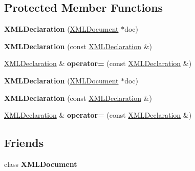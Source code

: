 \subsection*{Protected Member Functions}
\begin{DoxyCompactItemize}
\item 
\mbox{\label{classtinyxml2_1_1XMLDeclaration_aef9586f2ce5df5feba74dde49a242b06}} 
{\bfseries X\+M\+L\+Declaration} (\hyperlink{classtinyxml2_1_1XMLDocument}{X\+M\+L\+Document} $\ast$doc)
\item 
\mbox{\label{classtinyxml2_1_1XMLDeclaration_a5229cc0b31f034f93289af27ec3e2836}} 
{\bfseries X\+M\+L\+Declaration} (const \hyperlink{classtinyxml2_1_1XMLDeclaration}{X\+M\+L\+Declaration} \&)
\item 
\mbox{\label{classtinyxml2_1_1XMLDeclaration_a79eb518c2c2b1b99a122a5d5a308b7ee}} 
\hyperlink{classtinyxml2_1_1XMLDeclaration}{X\+M\+L\+Declaration} \& {\bfseries operator=} (const \hyperlink{classtinyxml2_1_1XMLDeclaration}{X\+M\+L\+Declaration} \&)
\item 
\mbox{\label{classtinyxml2_1_1XMLDeclaration_aef9586f2ce5df5feba74dde49a242b06}} 
{\bfseries X\+M\+L\+Declaration} (\hyperlink{classtinyxml2_1_1XMLDocument}{X\+M\+L\+Document} $\ast$doc)
\item 
\mbox{\label{classtinyxml2_1_1XMLDeclaration_a5229cc0b31f034f93289af27ec3e2836}} 
{\bfseries X\+M\+L\+Declaration} (const \hyperlink{classtinyxml2_1_1XMLDeclaration}{X\+M\+L\+Declaration} \&)
\item 
\mbox{\label{classtinyxml2_1_1XMLDeclaration_a79eb518c2c2b1b99a122a5d5a308b7ee}} 
\hyperlink{classtinyxml2_1_1XMLDeclaration}{X\+M\+L\+Declaration} \& {\bfseries operator=} (const \hyperlink{classtinyxml2_1_1XMLDeclaration}{X\+M\+L\+Declaration} \&)
\end{DoxyCompactItemize}
\subsection*{Friends}
\begin{DoxyCompactItemize}
\item 
\mbox{\label{classtinyxml2_1_1XMLDeclaration_a0a577a5e971b59b321cae12e5b61df55}} 
class {\bfseries X\+M\+L\+Document}
\end{DoxyCompactItemize}
